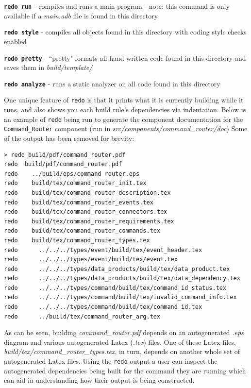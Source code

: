 \begin{spaceditemize}
  \item \textbf{\texttt{redo run}} - compiles and runs a main program - note: this command is only available if a \textit{main.adb} file is found in this directory
  \item \textbf{\texttt{redo style}} - compiles all objects found in this directory with coding style checks enabled
  \item \textbf{\texttt{redo pretty}} - ``pretty" formats all hand-written code found in this directory and saves them in \textit{build/template/}
  \item \textbf{\texttt{redo analyze}} - runs a static analyzer on all code found in this directory
\end{spaceditemize}
\vspace{5mm} %

One unique feature of \texttt{redo} is that it prints what it is currently building while it runs, and also shows you each build rule's dependencies via indentation. Below is an example of \texttt{redo} being run to generate the component documentation for the \texttt{Command\_Router} component (run in \textit{src/components/command\_router/doc}) Some of the output has been removed for brevity:

\vspace{5mm} %
\begin{verbatim}
> redo build/pdf/command_router.pdf
redo  build/pdf/command_router.pdf
redo    ../build/eps/command_router.eps
redo    build/tex/command_router_init.tex
redo    build/tex/command_router_description.tex
redo    build/tex/command_router_events.tex
redo    build/tex/command_router_connectors.tex
redo    build/tex/command_router_requirements.tex
redo    build/tex/command_router_commands.tex
redo    build/tex/command_router_types.tex
redo      ../../../types/event/build/tex/event_header.tex
redo      ../../../types/event/build/tex/event.tex
redo      ../../../types/data_products/build/tex/data_product.tex
redo      ../../../types/data_products/build/tex/data_dependency.tex
redo      ../../../types/command/build/tex/command_id_status.tex
redo      ../../../types/command/build/tex/invalid_command_info.tex
redo      ../../../types/command/build/tex/command_id.tex
redo      ../build/tex/command_router_arg.tex
\end{verbatim}
\vspace{5mm} %

As can be seen, building \textit{command\_router.pdf} depends on an autogenerated \textit{.eps} diagram and various autogenerated Latex (\textit{.tex}) files. One of these Latex files, \textit{build/tex/command\_router\_types.tex}, in turn, depends on another whole set of autogenerated Latex files. Using the \texttt{redo} output a user can inspect the autogenerated dependencies being built for the command they are running which can aid in understanding how their output is being constructed. \\

